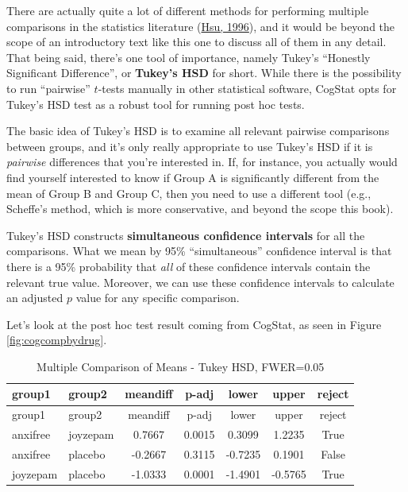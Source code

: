 \documentclass[
]{book}
\theoremstyle{definition}
\theoremstyle{definition}
\theoremstyle{definition}
\theoremstyle{definition}
\theoremstyle{remark}
\begin{document}
There are actually quite a lot of different methods for performing multiple comparisons in the statistics literature (\protect\hyperlink{ref-Hsu1996}{Hsu, 1996}), and it would be beyond the scope of an introductory text like this one to discuss all of them in any detail. That being said, there's one tool of importance, namely Tukey's ``Honestly Significant Difference'', or \textbf{Tukey's HSD} for short. While there is the possibility to run ``pairwise'' \(t\)-tests manually in other statistical software, CogStat opts for Tukey's HSD test as a robust tool for running post hoc tests.

The basic idea of Tukey's HSD is to examine all relevant pairwise comparisons between groups, and it's only really appropriate to use Tukey's HSD if it is \emph{pairwise} differences that you're interested in. If, for instance, you actually would find yourself interested to know if Group A is significantly different from the mean of Group B and Group C, then you need to use a different tool (e.g., Scheffe's method, which is more conservative, and beyond the scope this book).

Tukey's HSD constructs \textbf{simultaneous confidence intervals} for all the comparisons. What we mean by 95\% ``simultaneous'' confidence interval is that there is a 95\% probability that \emph{all} of these confidence intervals contain the relevant true value. Moreover, we can use these confidence intervals to calculate an adjusted \(p\) value for any specific comparison.

Let's look at the post hoc test result coming from CogStat, as seen in Figure \ref{fig:cogcompbydrug}.

\begin{longtable}[]{@{}llccccc@{}}
\caption{\label{tab:unnamed-chunk-73}Multiple Comparison of Means - Tukey HSD, FWER=0.05}\tabularnewline
\toprule()
group1 & group2 & meandiff & p-adj & lower & upper & reject \\
\midrule()
\endfirsthead
\toprule()
group1 & group2 & meandiff & p-adj & lower & upper & reject \\
\midrule()
\endhead
anxifree & joyzepam & 0.7667 & 0.0015 & 0.3099 & 1.2235 & True \\
anxifree & placebo & -0.2667 & 0.3115 & -0.7235 & 0.1901 & False \\
joyzepam & placebo & -1.0333 & 0.0001 & -1.4901 & -0.5765 & True \\
\bottomrule()
\end{longtable}
\end{document}
